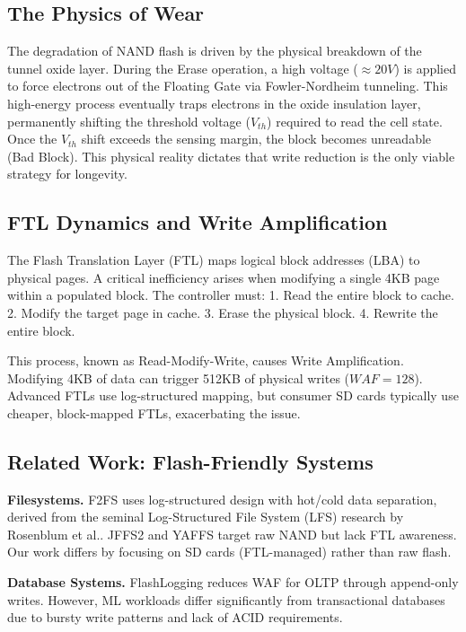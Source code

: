 \documentclass[conference]{IEEEtran}
\begin{document}
\subsection{The Physics of Wear}



The degradation of NAND flash is driven by the physical breakdown of the tunnel oxide layer.  During the Erase operation, a high voltage ($\approx 20V$) is applied to force electrons out of the Floating Gate via Fowler-Nordheim tunneling. This high-energy process eventually traps electrons in the oxide insulation layer, permanently shifting the threshold voltage ($V_{th}$) required to read the cell state. Once the $V_{th}$ shift exceeds the sensing margin, the block becomes unreadable (Bad Block). This physical reality dictates that write reduction is the only viable strategy for longevity.

\subsection{FTL Dynamics and Write Amplification}



The Flash Translation Layer (FTL) maps logical block addresses (LBA) to physical pages. A critical inefficiency arises when modifying a single 4KB page within a populated block. The controller must:
1. Read the entire block to cache.
2. Modify the target page in cache.
3. Erase the physical block.
4. Rewrite the entire block.

This process, known as Read-Modify-Write, causes Write Amplification. Modifying 4KB of data can trigger 512KB of physical writes ($WAF = 128$). Advanced FTLs use log-structured mapping, but consumer SD cards typically use cheaper, block-mapped FTLs, exacerbating the issue.

\subsection{Related Work: Flash-Friendly Systems}

\textbf{Filesystems.} F2FS uses log-structured design with hot/cold data separation, derived from the seminal Log-Structured File System (LFS) research by Rosenblum et al.. JFFS2 and YAFFS target raw NAND but lack FTL awareness. Our work differs by focusing on SD cards (FTL-managed) rather than raw flash.

\textbf{Database Systems.} FlashLogging reduces WAF for OLTP through append-only writes. However, ML workloads differ significantly from transactional databases due to bursty write patterns and lack of ACID requirements.
\end{document}
